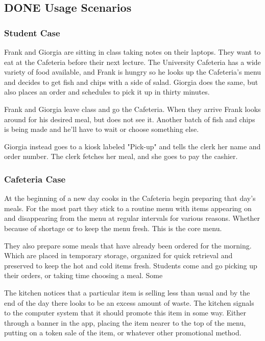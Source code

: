 \documentclass[11pt]{article}
\begin{document}
\subsection{{\bfseries\sffamily DONE} Usage Scenarios}
\label{sec:org415bbe4}
\subsubsection{Student Case}
\label{sec:org900b016}
Frank and Giorgia are sitting in class taking notes on their
laptops. They want to eat at the Cafeteria before their next
lecture. The University Cafeteria has a wide variety of food
available, and Frank is hungry so he looks up the Cafeteria's menu
and decides to get fish and chips with a side of salad. Giorgia
does the same, but also places an order and schedules to pick it
up in thirty minutes.

Frank and Giorgia leave class and go the Cafeteria. When they
arrive Frank looks around for his desired meal, but does not see
it. Another batch of fish and chips is being made and he'll have
to wait or choose something else. 

Giorgia instead goes to a kiosk labeled "Pick-up" and tells the
clerk her name and order number. The clerk fetches her meal, and
she goes to pay the cashier.
\subsubsection{Cafeteria Case}
\label{sec:org4fffb6e}
At the beginning of a new day cooks in the Cafeteria begin
preparing that day's meals. For the most part they stick to a
routine menu with items appearing on and disappearing from the
menu at regular intervals for various reasons. Whether because of
shortage or to keep the menu fresh. This is the core menu.

They also prepare some meals that have already been ordered for
the morning. Which are placed in temporary storage, organized for
quick retrieval and preserved to keep the hot and cold items
fresh. Students come and go picking up their orders, or taking
time choosing a meal. Some 

The kitchen notices that a particular item is selling less than
usual and by the end of the day there looks to be an excess amount
of waste. The kitchen signals to the computer system that it
should promote this item in some way. Either through a banner in
the app, placing the item nearer to the top of the menu, putting
on a token sale of the item, or whatever other promotional
method.
\end{document}
